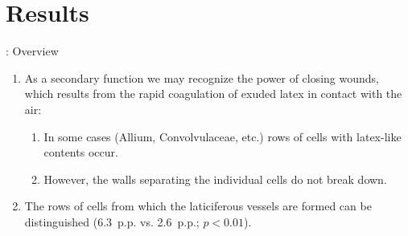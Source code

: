 \section{Results}


\begin{frame}{\titleprefix: Overview}

	\begin{enumerate}
		\item As a secondary function we may recognize the power of closing wounds, which results from the rapid coagulation of exuded latex in contact with the air:
		\begin{enumerate}
			\item In some cases (Allium, Convolvulaceae, etc.) rows of cells with latex-like contents occur.
			\item However, the walls separating the individual cells do not break down.
		\end{enumerate}
		\item The rows of cells from which the laticiferous vessels are formed can be distinguished (6.3~p.p. vs. 2.6~p.p.; ${p < 0.01}$).
	\end{enumerate}

\end{frame}


